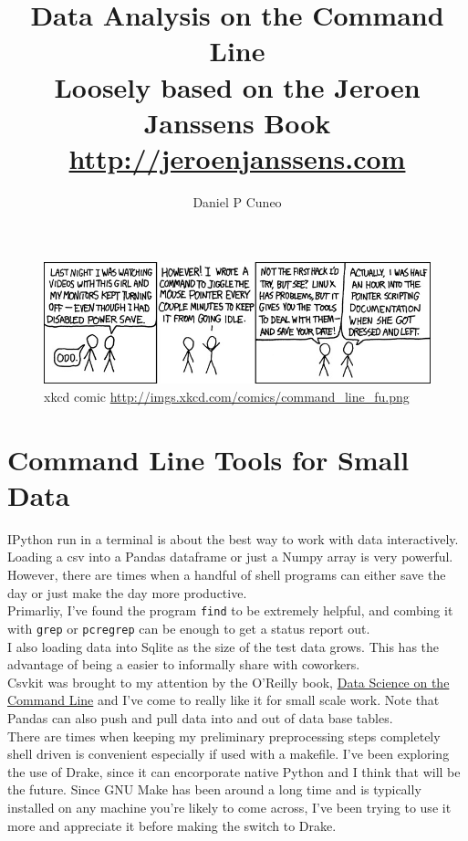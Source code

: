 \documentclass{article}
\title{Data Analysis on the Command Line \\
        \scriptsize{Loosely based on the Jeroen Janssens Book \\
    \url{http://jeroenjanssens.com}}}
\author{Daniel P Cuneo}
\begin{document}
    \maketitle

    \begin{figure}[h!]
        \includegraphics[scale=0.60]{command_line_fu.jpg}
        \caption{xkcd comic \url{http://imgs.xkcd.com/comics/command\_line\_fu.png}}
\end{figure}


    \section{Command Line Tools for Small Data}\label{command-line-tools-for-small-data}

IPython run in a terminal is about the best way to work with data
interactively. Loading a csv into a Pandas dataframe or just a Numpy
array is very powerful. However, there are times when a handful of shell
programs can either save the day or just make the day more productive.\\

Primarliy, I've found the program \texttt{find} to be extremely helpful, and
combing it with \texttt{grep} or \texttt{pcregrep} can be enough to get a status report out.\\

I also loading data into Sqlite as the size of the
test data grows. This has the advantage of being a easier to
informally share with coworkers.\\

Csvkit was brought to my attention by the O'Reilly book, \underline{Data Science on
the Command Line} and I've come to really like it for small scale work.
Note that Pandas can also push and pull data into and out of data base tables.\\

There are times when keeping my preliminary preprocessing steps
completely shell driven is convenient especially if used with a
makefile. I've been exploring the use of Drake, since it can encorporate
native Python and I think that will be the future. Since GNU Make has
been around a long time and is typically installed on any machine you're
likely to come across, I've been trying to use it more and appreciate it
before making the switch to Drake.
\end{document}
